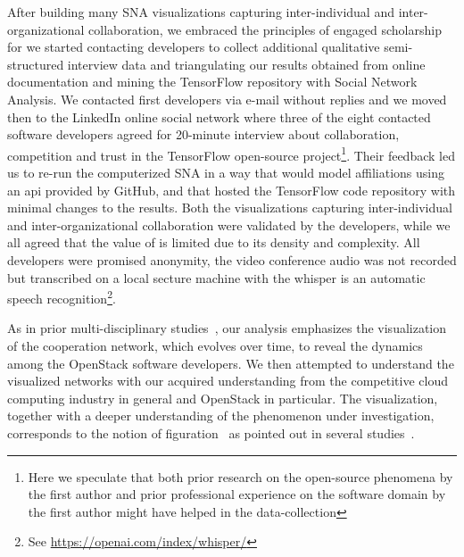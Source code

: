\documentclass[CHICAGO,Times1COL]{WileyNJDv5} %
\begin{document}
After building many SNA visualizations capturing inter-individual and inter-organizational collaboration, we embraced the principles of engaged scholarship for \citep[see][]{ring_structuring_1992} we started contacting developers to collect additional qualitative semi-structured interview data and triangulating our results obtained from online documentation and mining the TensorFlow repository with Social Network Analysis. We contacted first developers via e-mail without replies and we moved then to the LinkedIn online social network where three of the eight contacted software developers agreed for 20-minute interview about collaboration, competition and trust in the TensorFlow open-source project\footnote{Here we speculate that both prior research on the open-source phenomena by the first author and prior professional experience on the software domain by the first author might have helped in the data-collection}. Their feedback led us to re-run the computerized SNA in a way that would model affiliations using an \ac{api} provided by GitHub, and that hosted the TensorFlow code repository with minimal changes to the results.  Both the visualizations capturing inter-individual and inter-organizational collaboration were validated by the developers, while we all agreed that the value of  is limited due to its density and complexity. All developers were promised anonymity, the video conference audio was not recorded but transcribed on a local secture machine with the whisper is an automatic speech recognition\footnote{See \href{https://openai.com/index/whisper/}{https://openai.com/index/whisper/}}.

%
As in prior multi-disciplinary
studies~\citep{cambrosio_mapping_2004, glanzel_analysing_2005,porter_institutional_2005,lundvall1992,teixeira2015lessons}, %
our analysis emphasizes the visualization of the cooperation network, which evolves over time, to reveal the dynamics among the OpenStack software developers. We then attempted to understand the visualized networks with our acquired understanding from the competitive cloud computing industry in general and OpenStack in particular.
The visualization, together with a deeper understanding of the phenomenon under investigation, corresponds to the notion of figuration~\citep{elias_what_1978,smith2001norbert,elias1982civilizing} %
as pointed out in several studies~\citep{cambrosio_mapping_2004,newton2001organization,gfaller1993figuration}.
\end{document}

